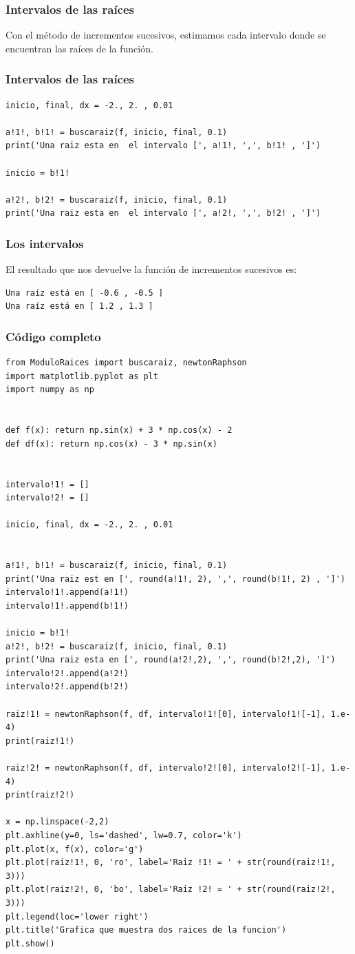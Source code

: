 \begin{frame}[fragile]
\frametitle{Intervalos de las raíces}
Con el método de incrementos sucesivos, estimamos cada intervalo donde se encuentran las raíces de la función.
\end{frame}
\begin{frame}
\frametitle{Intervalos de las raíces}
\begin{lstlisting}[caption=Intervalos para las raíces, style=FormattedNumber, basicstyle=\linespread{1.1}\ttfamily=\small, columns=fullflexible]
inicio, final, dx = -2., 2. , 0.01

a!1!, b!1! = buscaraiz(f, inicio, final, 0.1)
print('Una raiz esta en  el intervalo [', a!1!, ',', b!1! , ']')

inicio = b!1!

a!2!, b!2! = buscaraiz(f, inicio, final, 0.1)
print('Una raiz esta en  el intervalo [', a!2!, ',', b!2! , ']')
\end{lstlisting}
\end{frame}
\begin{frame}[fragile]
\frametitle{Los intervalos}
El resultado que nos devuelve la función de incrementos sucesivos es:
\begin{verbatim}
Una raíz está en [ -0.6 , -0.5 ]
Una raíz está en [ 1.2 , 1.3 ]
\end{verbatim}
\end{frame}
\begin{frame}
\frametitle{Código completo}
\begin{lstlisting}[caption=Intervalos para las raíces, style=FormattedNumber, basicstyle=\linespread{1.1}\ttfamily=\small, columns=fullflexible]
from ModuloRaices import buscaraiz, newtonRaphson
import matplotlib.pyplot as plt
import numpy as np


def f(x): return np.sin(x) + 3 * np.cos(x) - 2
def df(x): return np.cos(x) - 3 * np.sin(x)


intervalo!1! = []
intervalo!2! = []

inicio, final, dx = -2., 2. , 0.01


a!1!, b!1! = buscaraiz(f, inicio, final, 0.1)
print('Una raiz est en [', round(a!1!, 2), ',', round(b!1!, 2) , ']')
intervalo!1!.append(a!1!)
intervalo!1!.append(b!1!)

inicio = b!1!
a!2!, b!2! = buscaraiz(f, inicio, final, 0.1)
print('Una raiz esta en [', round(a!2!,2), ',', round(b!2!,2), ']')
intervalo!2!.append(a!2!)
intervalo!2!.append(b!2!)

raiz!1! = newtonRaphson(f, df, intervalo!1![0], intervalo!1![-1], 1.e-4)
print(raiz!1!)

raiz!2! = newtonRaphson(f, df, intervalo!2![0], intervalo!2![-1], 1.e-4)
print(raiz!2!)

x = np.linspace(-2,2)
plt.axhline(y=0, ls='dashed', lw=0.7, color='k')
plt.plot(x, f(x), color='g')
plt.plot(raiz!1!, 0, 'ro', label='Raiz !1! = ' + str(round(raiz!1!, 3)))
plt.plot(raiz!2!, 0, 'bo', label='Raiz !2! = ' + str(round(raiz!2!, 3)))
plt.legend(loc='lower right')
plt.title('Grafica que muestra dos raices de la funcion')
plt.show()
\end{lstlisting}    
\end{frame}
